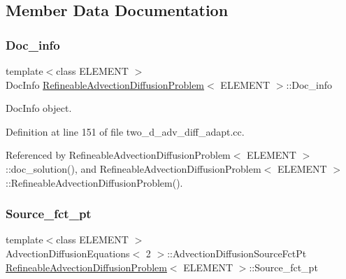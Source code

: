 \subsection{Member Data Documentation}
\mbox{\label{classRefineableAdvectionDiffusionProblem_a42bd65f40095a70a103ee900e7614b19}} 
\subsubsection{\texorpdfstring{Doc\+\_\+info}{Doc\_info}}
{\footnotesize\ttfamily template$<$class E\+L\+E\+M\+E\+NT $>$ \\
Doc\+Info \hyperlink{classRefineableAdvectionDiffusionProblem}{Refineable\+Advection\+Diffusion\+Problem}$<$ E\+L\+E\+M\+E\+NT $>$\+::Doc\+\_\+info\hspace{0.3cm}{\ttfamily [private]}}



Doc\+Info object. 



Definition at line 151 of file two\+\_\+d\+\_\+adv\+\_\+diff\+\_\+adapt.\+cc.



Referenced by Refineable\+Advection\+Diffusion\+Problem$<$ E\+L\+E\+M\+E\+N\+T $>$\+::doc\+\_\+solution(), and Refineable\+Advection\+Diffusion\+Problem$<$ E\+L\+E\+M\+E\+N\+T $>$\+::\+Refineable\+Advection\+Diffusion\+Problem().

\mbox{\label{classRefineableAdvectionDiffusionProblem_a8fa313562d365965e24282c2e11a8ec6}} 
\subsubsection{\texorpdfstring{Source\+\_\+fct\+\_\+pt}{Source\_fct\_pt}}
{\footnotesize\ttfamily template$<$class E\+L\+E\+M\+E\+NT $>$ \\
Advection\+Diffusion\+Equations$<$ 2 $>$\+::Advection\+Diffusion\+Source\+Fct\+Pt \hyperlink{classRefineableAdvectionDiffusionProblem}{Refineable\+Advection\+Diffusion\+Problem}$<$ E\+L\+E\+M\+E\+NT $>$\+::Source\+\_\+fct\+\_\+pt\hspace{0.3cm}{\ttfamily [private]}}



